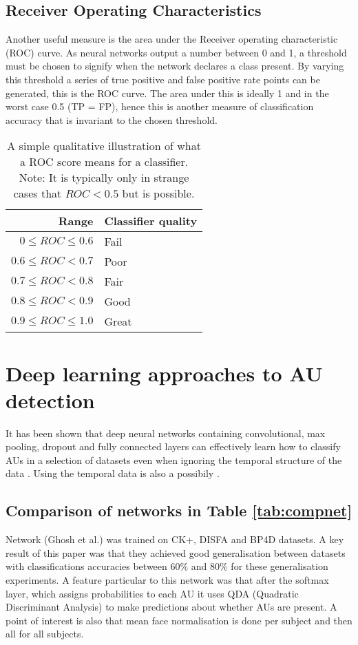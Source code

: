   \subsection{Receiver Operating Characteristics}
    Another useful measure is the area under the Receiver operating characteristic (ROC) curve.
    As neural networks output a number between 0 and 1, a threshold must be chosen to signify
    when the network declares a class present. By varying this threshold a series of true positive and false positive rate points
    can be generated, this is the ROC curve. The area under this is ideally 1 and in the worst case 0.5 (TP = FP), hence this is
    another measure of classification accuracy that is invariant to the chosen threshold.

    \begin{table}[]
      \centering \caption{A simple qualitative illustration of what a ROC score means for a classifier.
      Note: It is typically only in strange cases that $ROC< 0.5$ but is possible.} \label{my-label}
      \begin{tabular}{rl}
        \hline
        Range & Classifier quality \\ \hline
        $0 \leq ROC \leq 0.6$   & Fail               \\
        $0.6 \leq ROC    < 0.7$   & Poor               \\
        $0.7 \leq ROC    < 0.8$   & Fair               \\
        $0.8 \leq ROC    < 0.9$   & Good               \\
        $0.9 \leq ROC \leq 1.0$   & Great              \\ \hline
      \end{tabular}
  \end{table}
  \section{Deep learning approaches to AU detection}
    It has been shown that deep neural networks containing convolutional, max pooling,
    dropout and fully connected layers can effectively learn how to classify AUs in
    a selection of datasets even when ignoring the temporal structure of the data \cite{Gudi2015,Ghosh2015,Khorrami2015}.
    Using the temporal data is also a possibily \cite{emonet,Jaiswal2016}.
    \subsection*{Comparison of networks in Table \ref{tab:compnet}}
    Network \cite{Ghosh2015} (Ghosh et al.) was trained on CK+, DISFA and BP4D datasets.
    A key result of this paper was that they achieved good generalisation between datasets
    with classifications accuracies between 60\% and 80\% for these generalisation experiments.
    A feature particular to this network was that after the softmax layer, which assigns probabilities
    to each AU it uses QDA (Quadratic Discriminant Analysis\cite{precogbook})  to
    make predictions about whether AUs are present. A point of interest is also that
    mean face normalisation is done per subject and then all for all subjects.

